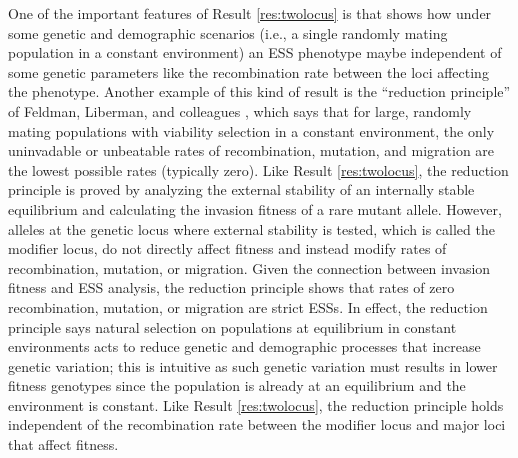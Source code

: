 \documentclass[11pt]{article}
\begin{document}
\begin{figure}[t!]
  \label{fig:pip:switching}
\end{figure}

One of the important features of Result \ref{res:twolocus} is that shows how under some genetic and demographic scenarios (i.e., a single randomly mating population in a constant environment) an ESS phenotype maybe independent of some genetic parameters like the recombination rate between the loci affecting the phenotype. Another example of this kind of result is the ``reduction principle'' of Feldman, Liberman, and colleagues \cite{Feldman:Liberman:1986,Liberman:Feldman:1986,Liberman:Feldman:1986a,Liberman:Feldman:1989,Altenberg:Liberman:2017}, which says that for large, randomly mating populations with viability selection in a constant environment, the only uninvadable or unbeatable rates of recombination, mutation, and migration are the lowest possible rates (typically zero). Like Result \ref{res:twolocus}, the reduction principle is proved by analyzing the external stability of an internally stable equilibrium and calculating the invasion fitness of a rare mutant allele. However, alleles at the genetic locus where external stability is tested, which is called the modifier locus, do not directly affect fitness and instead modify rates of recombination, mutation, or migration. Given the connection between invasion fitness and ESS analysis, the reduction principle shows that rates of zero recombination, mutation, or migration are strict ESSs. In effect, the reduction principle says natural selection on populations at equilibrium in constant environments acts to reduce genetic and demographic processes that increase genetic variation; this is intuitive as such genetic variation must results in lower fitness genotypes since the population is already at an equilibrium and the environment is constant. Like Result \ref{res:twolocus}, the reduction principle holds independent of the recombination rate between the modifier locus and major loci that affect fitness.
\end{document}

